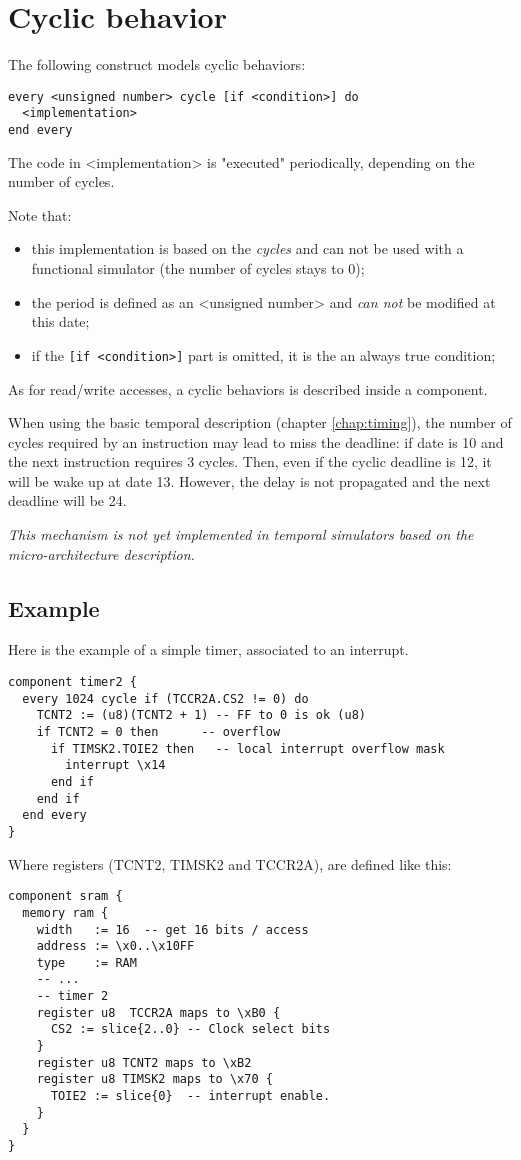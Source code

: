 \section{Cyclic behavior}
The following construct models cyclic behaviors:
\begin{lstlisting}
every <unsigned number> cycle [if <condition>] do
  <implementation>
end every
\end{lstlisting}
The code in <implementation> is "executed" periodically, depending on the number of cycles.

Note that:
\begin{itemize}
\item this implementation is based on the \emph{cycles} and can not be used with a functional simulator (the number of cycles stays to 0);
\item the period is defined as an <unsigned number> and \emph{can not} be modified at this date;
\item if the \texttt{[if <condition>]} part is omitted, it is the an always true condition;
\end{itemize}

As for read/write accesses, a cyclic behaviors is described inside a component.

When using the basic temporal description (chapter \ref{chap:timing}), the number of cycles required by an instruction may lead to miss the deadline: if date is 10 and the next instruction requires 3 cycles. Then, even if the cyclic deadline is 12, it will be wake up at date 13. However, the delay is not propagated and the next deadline will be 24.

\emph{This mechanism is not yet implemented in temporal simulators based on the micro-architecture description.}

\subsection{Example}
Here is the example of a simple timer, associated to an interrupt. 

\begin{lstlisting}
component timer2 {
  every 1024 cycle if (TCCR2A.CS2 != 0) do
    TCNT2 := (u8)(TCNT2 + 1) -- FF to 0 is ok (u8)
    if TCNT2 = 0 then      -- overflow
      if TIMSK2.TOIE2 then   -- local interrupt overflow mask
        interrupt \x14
      end if
    end if
  end every
}
\end{lstlisting}

Where registers (TCNT2, TIMSK2 and TCCR2A), are defined like this:
\begin{lstlisting}
component sram {
  memory ram {
    width   := 16  -- get 16 bits / access
    address := \x0..\x10FF
    type    := RAM
    -- ...
    -- timer 2
    register u8  TCCR2A maps to \xB0 {
      CS2 := slice{2..0} -- Clock select bits
    }
    register u8 TCNT2 maps to \xB2
    register u8 TIMSK2 maps to \x70 {
      TOIE2 := slice{0}  -- interrupt enable.
    }
  }
}
\end{lstlisting}
